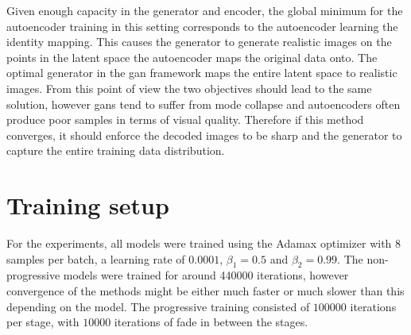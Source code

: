 Given enough capacity in the generator and encoder, the global minimum for the autoencoder training in this setting corresponds to the autoencoder learning the identity mapping. This causes the generator to generate realistic images on the points in the latent space the autoencoder maps the original data onto. The optimal generator in the \acrshort{gan} framework maps the entire latent space to realistic images. From this point of view the two objectives should lead to the same solution, however \acrshort{gans} tend to suffer from mode collapse and autoencoders often produce poor samples in terms of visual quality. Therefore if this method converges, it should enforce the decoded images to be sharp and the generator to capture the entire training data distribution.

\section{Training setup}
For the experiments, all models were trained using the Adamax optimizer \parencite{kingma2014adam} with $8$ samples per batch, a learning rate of $0.0001$, $\beta_1 = 0.5$ and $\beta_2 = 0.99$. The non-progressive models were trained for around 440000 iterations, however convergence of the methods might be either much faster or much slower than this depending on the model. The progressive training consisted of $100000$ iterations per stage, with $10000$ iterations of fade in between the stages.

